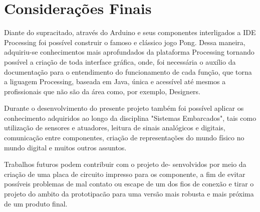 \documentclass[conference]{IEEEtran}
\begin{document}
\section*{Considerações Finais}
Diante do supracitado,  através do Arduino e seus componentes interligados a IDE Processing foi possível construir o famoso e clássico jogo Pong. Dessa maneira, adquiriu-se conhecimentos mais aprofundados da plataforma Processing tornando possível a criação de toda interface gráfica, onde, foi necessária o auxílio da documentação para o entendimento do funcionamento de cada função, que torna a liguagem Processing, baseada em Java, única e acessível até mesmos a profissionais que não são da área como, por exemplo, Designers.

Durante o desenvolvimento do presente projeto também foi possível aplicar os conhecimento adquiridos ao longo da disciplina "Sistemas Embarcados", tais como utilização de sensores e atuadores, leitura de sinais analógicos e digitais, comunicação entre componentes, criação de representações do mundo físico no mundo digital e muitos outros assuntos.

Trabalhos futuros podem contribuir com o projeto de-
senvolvidos por meio da criação de uma placa de circuito impresso para os componente, a fim de evitar possíveis problemas de mal contato ou escape de um dos fios de conexão e tirar o projeto do ambito da prototipacão para uma versão mais robusta e mais próxima de um produto final.
\section*{}




\end{document}
